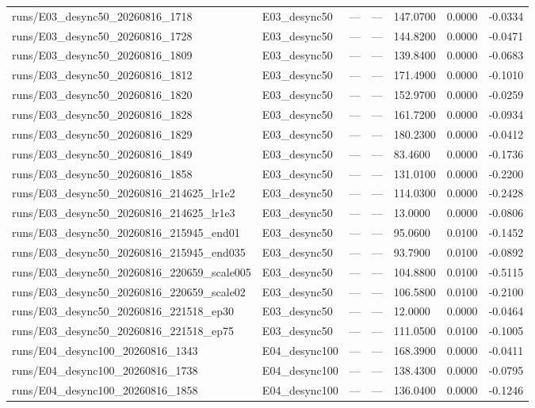 \begin{tabular}{lllllll}
runs/E03_desync50_20260816_1718 & E03_desync50 & — & — & 147.0700 & 0.0000 & -0.0334 \\
runs/E03_desync50_20260816_1728 & E03_desync50 & — & — & 144.8200 & 0.0000 & -0.0471 \\
runs/E03_desync50_20260816_1809 & E03_desync50 & — & — & 139.8400 & 0.0000 & -0.0683 \\
runs/E03_desync50_20260816_1812 & E03_desync50 & — & — & 171.4900 & 0.0000 & -0.1010 \\
runs/E03_desync50_20260816_1820 & E03_desync50 & — & — & 152.9700 & 0.0000 & -0.0259 \\
runs/E03_desync50_20260816_1828 & E03_desync50 & — & — & 161.7200 & 0.0000 & -0.0934 \\
runs/E03_desync50_20260816_1829 & E03_desync50 & — & — & 180.2300 & 0.0000 & -0.0412 \\
runs/E03_desync50_20260816_1849 & E03_desync50 & — & — & 83.4600 & 0.0000 & -0.1736 \\
runs/E03_desync50_20260816_1858 & E03_desync50 & — & — & 131.0100 & 0.0000 & -0.2200 \\
runs/E03_desync50_20260816_214625_lr1e2 & E03_desync50 & — & — & 114.0300 & 0.0000 & -0.2428 \\
runs/E03_desync50_20260816_214625_lr1e3 & E03_desync50 & — & — & 13.0000 & 0.0000 & -0.0806 \\
runs/E03_desync50_20260816_215945_end01 & E03_desync50 & — & — & 95.0600 & 0.0100 & -0.1452 \\
runs/E03_desync50_20260816_215945_end035 & E03_desync50 & — & — & 93.7900 & 0.0100 & -0.0892 \\
runs/E03_desync50_20260816_220659_scale005 & E03_desync50 & — & — & 104.8800 & 0.0100 & -0.5115 \\
runs/E03_desync50_20260816_220659_scale02 & E03_desync50 & — & — & 106.5800 & 0.0100 & -0.2100 \\
runs/E03_desync50_20260816_221518_ep30 & E03_desync50 & — & — & 12.0000 & 0.0000 & -0.0464 \\
runs/E03_desync50_20260816_221518_ep75 & E03_desync50 & — & — & 111.0500 & 0.0100 & -0.1005 \\
runs/E04_desync100_20260816_1343 & E04_desync100 & — & — & 168.3900 & 0.0000 & -0.0411 \\
runs/E04_desync100_20260816_1738 & E04_desync100 & — & — & 138.4300 & 0.0000 & -0.0795 \\
runs/E04_desync100_20260816_1858 & E04_desync100 & — & — & 136.0400 & 0.0000 & -0.1246 \\

\end{tabular}
